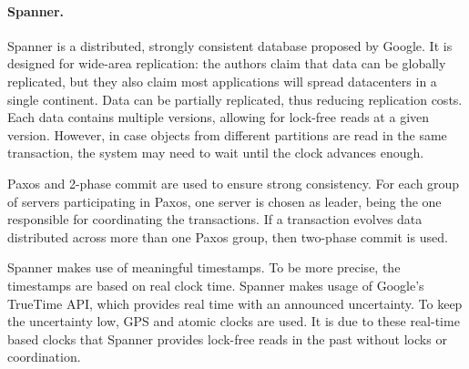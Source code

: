 

\paragraph{Spanner.} Spanner \cite{spanner} is a distributed, strongly consistent database proposed by Google.
It is designed for wide-area replication: the authors claim that data can be globally replicated, but they also claim most applications will spread datacenters in a single continent.
Data can be partially replicated, thus reducing replication costs.
Each data contains multiple versions, allowing for lock-free reads at a given version.
However, in case objects from different partitions are read in the same transaction, the system may need to wait until the clock advances enough.

Paxos and 2-phase commit are used to ensure strong consistency.
For each group of servers participating in Paxos, one server is chosen as leader, being the one responsible for coordinating the transactions.
If a transaction evolves data distributed across more than one Paxos group, then two-phase commit is used.

Spanner makes use of meaningful timestamps.
To be more precise, the timestamps are based on real clock time.
Spanner makes usage of Google's TrueTime API, which provides real time with an announced uncertainty.
To keep the uncertainty low, GPS and atomic clocks are used.
It is due to these real-time based clocks that Spanner provides lock-free reads in the past without locks or coordination.

